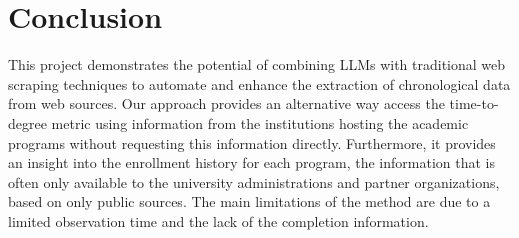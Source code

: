 \documentclass[11pt]{article}
\begin{document}
\section{Conclusion}

    This project demonstrates the potential of combining LLMs with traditional web scraping techniques to automate and enhance the extraction of chronological data from web sources.
    Our approach provides an alternative way access the time-to-degree metric using information from the institutions hosting the academic programs without requesting this information directly.
    Furthermore, it provides an insight into the enrollment history for each program, the information that is often only available to the university administrations and partner organizations, based on only public sources.
    The main limitations of the method are due to a limited observation time and the lack of the completion information.
\end{document}
